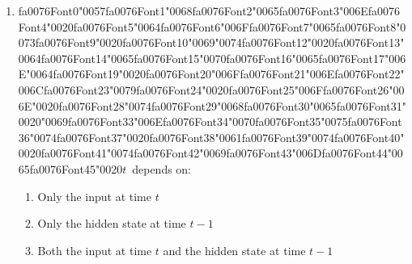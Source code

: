 \documentclass[12pt]{article}
\begin{document}
\begin{enumerate}[label=Q\arabic*.]
\begin{enumerate}[label=(\Alph*)]
    \item The next word given the predicted history
    \item The next word given the ground-truth history
    \item The current word given itself
    \item All words simultaneously
\end{enumerate}
\item {\csname fa0076Font0\endcsname\char"0057}{\csname fa0076Font1\endcsname\char"0068}{\csname fa0076Font2\endcsname\char"0065}{\csname fa0076Font3\endcsname\char"006E}{\csname fa0076Font4\endcsname\char"0020}{\csname fa0076Font5\endcsname\char"0064}{\csname fa0076Font6\endcsname\char"006F}{\csname fa0076Font7\endcsname\char"0065}{\csname fa0076Font8\endcsname\char"0073}{\csname fa0076Font9\endcsname\char"0020}{\csname fa0076Font10\endcsname\char"0069}{\char"0074}{\csname fa0076Font12\endcsname\char"0020}{\csname fa0076Font13\endcsname\char"0064}{\csname fa0076Font14\endcsname\char"0065}{\csname fa0076Font15\endcsname\char"0070}{\csname fa0076Font16\endcsname\char"0065}{\csname fa0076Font17\endcsname\char"006E}{\char"0064}{\csname fa0076Font19\endcsname\char"0020}{\csname fa0076Font20\endcsname\char"006F}{\csname fa0076Font21\endcsname\char"006E}{\csname fa0076Font22\endcsname\char"006C}{\csname fa0076Font23\endcsname\char"0079}{\csname fa0076Font24\endcsname\char"0020}{\csname fa0076Font25\endcsname\char"006F}{\csname fa0076Font26\endcsname\char"006E}{\char"0020}{\csname fa0076Font28\endcsname\char"0074}{\csname fa0076Font29\endcsname\char"0068}{\csname fa0076Font30\endcsname\char"0065}{\csname fa0076Font31\endcsname\char"0020}{\char"0069}{\csname fa0076Font33\endcsname\char"006E}{\csname fa0076Font34\endcsname\char"0070}{\csname fa0076Font35\endcsname\char"0075}{\csname fa0076Font36\endcsname\char"0074}{\csname fa0076Font37\endcsname\char"0020}{\csname fa0076Font38\endcsname\char"0061}{\csname fa0076Font39\endcsname\char"0074}{\csname fa0076Font40\endcsname\char"0020}{\csname fa0076Font41\endcsname\char"0074}{\csname fa0076Font42\endcsname\char"0069}{\csname fa0076Font43\endcsname\char"006D}{\csname fa0076Font44\endcsname\char"0065}{\csname fa0076Font45\endcsname\char"0020}$t$\  depends on:
\begin{enumerate}[label=(\Alph*)]
    \item Only the input at time $t$
    \item Only the hidden state at time $t-1$
    \item Both the input at time $t$ and the hidden state at time $t-1$

\end{enumerate}
\end{enumerate}
\end{document}
